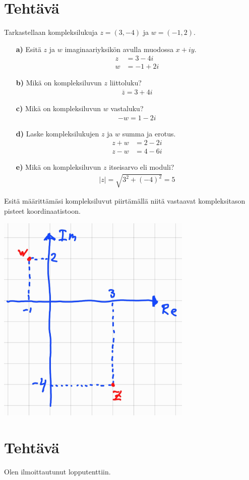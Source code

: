 \documentclass{article}
\newcounter{tehtava}
\begin{document}
\section*{Tehtävä \thetehtava}
Tarkastellaan kompleksilukuja $z = (3, -4)$ ja $w = (-1, 2)$.
\begin{itemize}
    \item[\textbf{a)}] Esitä $z$ ja $w$ imaginaariyksikön avulla muodossa $x + iy$.
    \[
    \begin{aligned}
        z &= 3 - 4i \\
        w &= -1 + 2i
    \end{aligned}
    \]
    \item[\textbf{b)}] Mikä on kompleksiluvun $z$ liittoluku?
    \[
    \begin{aligned}
        \overline{z} = 3 + 4i
    \end{aligned}
    \]
    \item[\textbf{c)}] Mikä on kompleksiluvun $w$ vastaluku?
    \[
    \begin{aligned}
        -w = 1 - 2i
    \end{aligned}
    \]
    \item[\textbf{d)}] Laske kompleksilukujen $z$ ja $w$ summa ja erotus.
    \[
    \begin{aligned}
        z + w &= 2 - 2i \\
        z - w &= 4 - 6i
    \end{aligned}
    \]
    \item[\textbf{e)}] Mikä on kompleksiluvun $z$ itseisarvo eli moduli?
    \[
    \begin{aligned}
        |z| = \sqrt{3^2 + (-4)^2} = 5
    \end{aligned}
    \]
\end{itemize}
Esitä määrittämäsi kompleksiluvut piirtämällä niitä vastaavat kompleksitason pisteet koordinaatistoon.

\begin{center}
    \includegraphics[width=0.7\textwidth]{harj5teht5.jpg}
\end{center}

\newpage
{}
\section*{Tehtävä \thetehtava}
Olen ilmoittautunut lopputenttiin.
\end{document}
